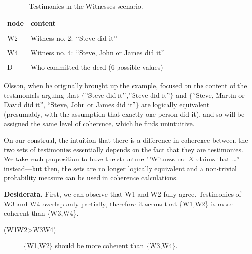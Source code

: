 \documentclass[
  10pt,
]{scrartcl}
\newcommand{\s}[1]{\textsf{#1}}
\begin{document}
\begin{table}[H]

\caption{\label{tab:witnessesProp}Testimonies in the Witnesses scenario.}
\centering
\begin{tabular}[t]{ll}
\toprule
node & content\\
\midrule
\cellcolor{gray!6}{W1} & \cellcolor{gray!6}{Witness no. 1: ‘‘Steve did it’’}\\
W2 & Witness no. 2: ‘‘Steve did it’’\\
\cellcolor{gray!6}{W3} & \cellcolor{gray!6}{Witness no. 3: ‘‘Steve, Martin or David did it’’}\\
W4 & Witness no. 4: ‘‘Steve, John or James did it’’\\
\cellcolor{gray!6}{W5} & \cellcolor{gray!6}{Wittness no. 5: ‘‘Steve, John or Peter did it’’}\\
D & Who committed the deed (6  possible values)\\
\bottomrule
\end{tabular}
\end{table}

Olsson, when he originally brought up the example, focused on the content of the testimonials arguing that \(\{\)`'Steve did it'`,'`Steve did it''\(\}\) and \(\{\)``Steve, Martin or David did it'', ``Steve, John or James did it''\(\}\) are logically equivalent (presumably, with the assumption that exactly one person did it), and so will be assigned the same level of coherence, which he finds unintuitive.

On our construal, the intuition that there is a difference in coherence between the two sets of testimonies essentially depends on the fact that they are testimonies. We take each proposition to have the structure '\,'Witness no. \(X\) claims that \dots'' instead---but then, the sets are no longer logically equivalent and a non-trivial probability measure can be used in coherence calculations.

\textbf{Desiderata.} First, we can observe that \s{W1} and \s{W2} fully agree. Testimonies of \s{W3} and \s{W4} overlap only partially, therefore it seems that \{\s{W1},\s{W2}\} is more coherent than \{\s{W3},\s{W4}\}.
\vspace{2mm}

\begin{description}
    \item[(\s{W1W2\textgreater W3W4})] \{\s{W1},\s{W2}\} should be more coherent than \{\s{W3},\s{W4}\}.
\end{description}\vspace{2mm}
\end{document}
